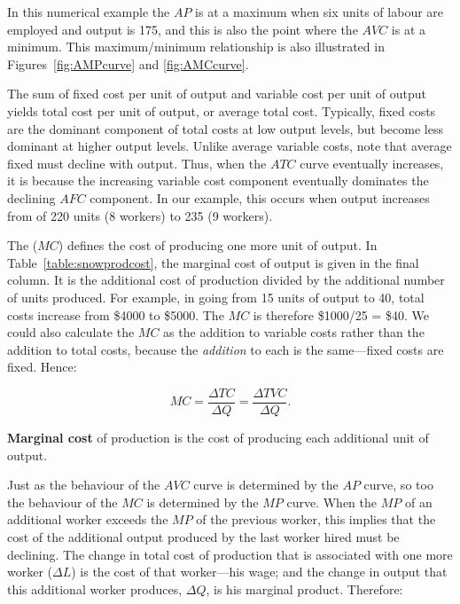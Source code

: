 In this numerical example the $AP$ is at a maximum when six units of labour are employed and output is 175, and this is also the point where the $AVC$ is at a minimum. This maximum/minimum relationship is also illustrated in Figures~\ref{fig:AMPcurve} and \ref{fig:AMCcurve}.

The sum of fixed cost per unit of output and variable cost per unit of output yields total cost per unit of output, or average total cost. Typically, fixed costs are the dominant component of total costs at low output levels, but become less dominant at higher output levels. Unlike average variable costs, note that average fixed must decline with output. Thus, when the $ATC$ curve eventually increases, it is because the increasing variable cost component eventually dominates the declining $AFC$ component. In our example, this occurs when output increases from of 220 units (8 workers) to 235 (9 workers). 

The  ($MC$) defines the cost of producing one more unit of output. In Table~\ref{table:snowprodcost}, the marginal cost of output is given in the final column. It is the additional cost of production divided by the additional number of units produced. For example, in going from 15 units of output to 40, total costs increase from \$4000 to \$5000. The $MC$ is therefore \$1000/25 = \$40. We could also calculate the $MC$ as the addition to variable costs rather than the addition to total costs, because the \textit{addition} to each is the same---fixed costs are fixed. Hence:

\begin{equation*}
MC=\frac{\Delta TC}{\Delta Q}=\frac{\Delta TVC}{\Delta Q}.
\end{equation*}

\begin{DefBox}
\textbf{Marginal cost} of production is the cost of producing each additional unit of output.
\end{DefBox}

Just as the behaviour of the $AVC$ curve is determined by the $AP$ curve, so too the behaviour of the $MC$ is determined by the $MP$ curve. When the $MP$ of an additional worker exceeds the $MP$ of the previous worker, this implies that the cost of the additional output produced by the last worker hired must be declining. The change in total cost of production that is associated with one more worker ($\Delta L$) is the cost of that worker---his wage; and the change in output that this additional worker produces, $\Delta Q$, is his marginal product. Therefore:

